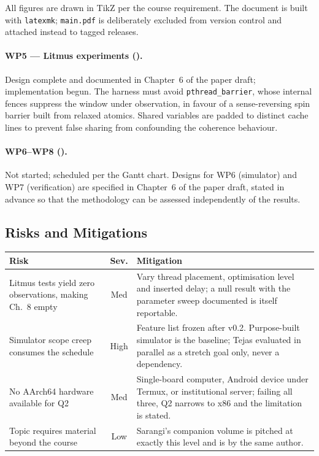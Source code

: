 \noindent All figures are drawn in TikZ per the course requirement. The
document is built with \texttt{latexmk}; \texttt{main.pdf} is deliberately
excluded from version control and attached instead to tagged releases.

\paragraph{WP5 --- Litmus experiments ().}
Design complete and documented in Chapter~6 of the paper draft; implementation
begun. The harness must avoid \texttt{pthread\_barrier}, whose internal fences
suppress the window under observation, in favour of a sense-reversing spin
barrier built from relaxed atomics. Shared variables are padded to distinct
cache lines to prevent false sharing from confounding the coherence behaviour.

\paragraph{WP6--WP8 ().}
Not started; scheduled per the Gantt chart. Designs for WP6 (simulator) and
WP7 (verification) are specified in Chapter~6 of the paper draft, stated in
advance so that the methodology can be assessed independently of the results.

\subsection{Risks and Mitigations}

\begin{table}[H]
\centering
\small
\begin{tabular}{@{}p{4.6cm}cp{7.0cm}@{}}
\toprule
\textbf{Risk} & \textbf{Sev.} & \textbf{Mitigation} \\
\midrule
Litmus tests yield zero observations, making Ch.~8 empty
 & Med & Vary thread placement, optimisation level and inserted delay; a null
        result with the parameter sweep documented is itself reportable. \\
Simulator scope creep consumes the schedule
 & High & Feature list frozen after v0.2. Purpose-built simulator is the
         baseline; Tejas \cite{sarangi2023nextgen} evaluated in parallel as a
         stretch goal only, never a dependency. \\
No AArch64 hardware available for Q2
 & Med & Single-board computer, Android device under Termux, or institutional
         server; failing all three, Q2 narrows to x86 and the limitation is
         stated. \\
Topic requires material beyond the course
 & Low & Sarangi's companion volume \cite{sarangi2023nextgen} is pitched at
        exactly this level and is by the same author. \\
\bottomrule
\end{tabular}
\end{table}

